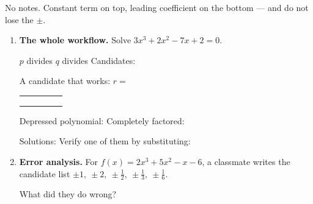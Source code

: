 \documentclass[10pt]{article}
\begin{document}
\namedateperiod

\vspace{0.10in}

No notes. Constant term on top, leading coefficient on the bottom --- and do not lose the $\pm$.

\begin{enumerate}[leftmargin=1.8em, itemsep=11pt]
  \item \textbf{The whole workflow.} Solve $3x^3 + 2x^2 - 7x + 2 = 0$.

    \vspace{3pt}
    $p$ divides  \quad $q$ divides  \quad
    Candidates: 

    \vspace{3pt}
    A candidate that works: $r = $ 
    \begin{center}
    \renewcommand{\arraystretch}{1.6}
    \begin{tabular}{r|C{1.5cm}C{1.5cm}C{1.5cm}C{1.5cm}}
     &  &  &  &  \\
        &     &  &  &  \\ 
        &  &  &  &  \\
    \end{tabular}
    \end{center}

    \vspace{2pt}
    Depressed polynomial:  \quad Completely factored: 

    \vspace{3pt}
    Solutions:  \quad Verify one of them by substituting:

  \item \textbf{Error analysis.} For $f(x) = 2x^3 + 5x^2 - x - 6$, a classmate writes the candidate
    list $\pm 1,\ \pm 2,\ \pm\tfrac12,\ \pm\tfrac13,\ \pm\tfrac16$.

    \vspace{3pt}
    What did they do wrong? 


\end{enumerate}
\end{document}
